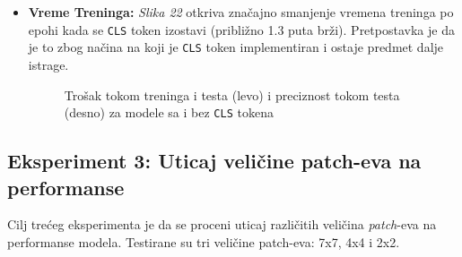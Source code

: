 \documentclass[12pt]{article}
\begin{document}
\begin{itemize}
      \newpage
      \item \textbf{Vreme Treninga:} \textit{Slika 22} otkriva 
      značajno smanjenje vremena treninga po epohi kada se \texttt{CLS} token izostavi 
      (približno 1.3 puta brži). Pretpostavka je da je to zbog načina 
      na koji je \texttt{CLS} token implementiran i ostaje  
      predmet dalje istrage.
      \begin{figure}[h!]
         \centering
         \caption{Trošak tokom treninga i testa (levo) i preciznost tokom testa (desno) za modele sa i bez \texttt{CLS} tokena}
         \label{fig:exp2_time}
      \end{figure}
   \end{itemize}

   \newpage
   \subsection{Eksperiment 3: Uticaj veličine patch-eva na performanse}
   Cilj trećeg eksperimenta je da se proceni uticaj različitih veličina 
   \textit{patch}-eva na performanse modela. Testirane su tri veličine 
   patch-eva: 7x7, 4x4 i 2x2.
\end{document}
